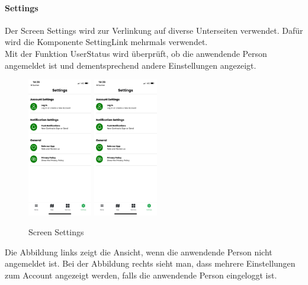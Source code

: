 \paragraph{Settings}Der Screen Settings wird zur Verlinkung auf diverse Unterseiten verwendet. Dafür wird die Komponente SettingLink mehrmals verwendet.\\
Mit der Funktion UserStatus wird überprüft, ob die anwendende Person angemeldet ist und dementsprechend andere Einstellungen angezeigt. \\
\begin{figure}[H]
  \centering
  \includegraphics[width=0.25\textwidth]{images/app-screenshots/screensettingsa.png}
  \includegraphics[width=0.25\textwidth]{images/app-screenshots/screensettingsa.png}
  \caption{Screen Settings}
  \label{fig:screensettings}
\end{figure}
Die Abbildung links zeigt die Ansicht, wenn die anwendende Person nicht angemeldet ist. Bei der Abbildung rechts sieht man, dass mehrere Einstellungen zum Account angezeigt werden, falls die anwendende Person eingeloggt ist. \\


